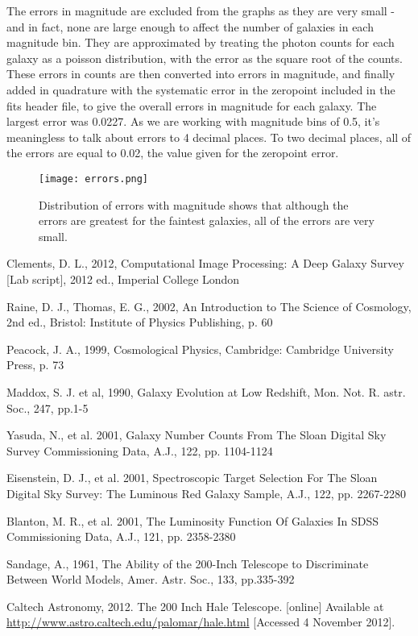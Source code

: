 \documentclass[a4paper,11pt,twoside]{article}
\begin{document}
The errors in magnitude are excluded from the graphs as they are very small - and in fact, none are large enough to affect the number of galaxies in each magnitude bin. 
They are approximated by treating the photon counts for each galaxy as a poisson distribution, with the error as the square root of the counts. These errors in counts are then converted into errors in magnitude, and finally added in quadrature with the systematic error in the zeropoint included in the fits header file, to give the overall errors in magnitude for each galaxy. The largest error was 0.0227. As we are working with magnitude bins of 0.5, it's meaningless to talk about errors to 4 decimal places. To two decimal places, all of the errors are equal to 0.02, the value given for the zeropoint error. 

\begin{figure}[htb]
  \centering
  \texttt{[image: errors.png]}
  \caption{Distribution of errors with magnitude shows that although 
the errors are greatest for the faintest galaxies, 
all of the errors are very small.}
  \label{fig:errors}
\end{figure}

\begin{thebibliography}{9}

Clements, D. L., 2012, Computational Image Processing: A Deep Galaxy Survey [Lab script], 2012 ed., Imperial College London

Raine, D. J., Thomas, E. G., 2002, An Introduction to The Science of Cosmology, 2nd ed., Bristol: Institute of Physics Publishing, p. 60

Peacock, J. A., 1999, Cosmological Physics, Cambridge: Cambridge University Press, p. 73

Maddox, S. J. et al, 1990, Galaxy Evolution at Low Redshift, Mon. Not. R. astr. Soc., 247, pp.1-5

Yasuda, N., et al. 2001, Galaxy Number Counts From The Sloan Digital Sky Survey Commissioning Data, A.J., 122, pp. 1104-1124

Eisenstein, D. J., et al. 2001, Spectroscopic Target Selection For The Sloan Digital Sky Survey: The Luminous Red Galaxy Sample, A.J., 122, pp. 2267-2280

Blanton, M. R., et al. 2001, The Luminosity Function Of Galaxies In SDSS Commissioning Data, A.J., 121, pp. 2358-2380

Sandage, A., 1961, The Ability of the 200-Inch Telescope to Discriminate Between World Models, Amer. Astr. Soc., 133, pp.335-392

Caltech Astronomy, 2012. The 200 Inch Hale Telescope. [online] Available at \url{http://www.astro.caltech.edu/palomar/hale.html}
[Accessed 4 November 2012].

\end{thebibliography}
\end{document}
